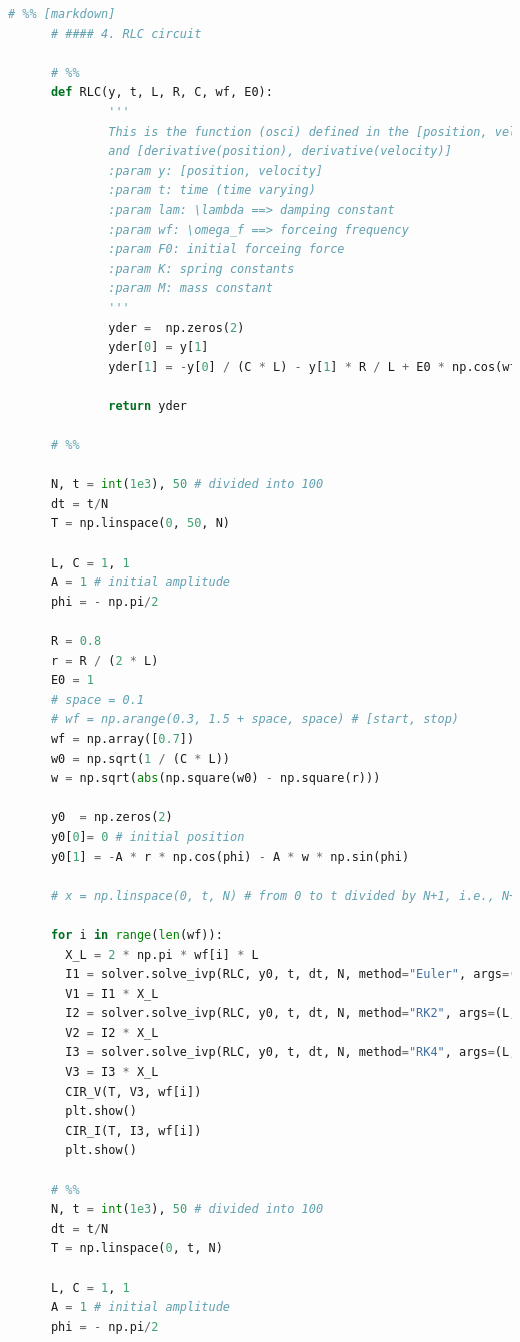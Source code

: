 \documentclass[12pt]{article}
\begin{document}
\begin{lstlisting}[language={Python}]
      # %% [markdown]
      # #### 4. RLC circuit

      # %%
      def RLC(y, t, L, R, C, wf, E0):
              '''
              This is the function (osci) defined in the [position, velocity] 
              and [derivative(position), derivative(velocity)]
              :param y: [position, velocity]
              :param t: time (time varying)
              :param lam: \lambda ==> damping constant
              :param wf: \omega_f ==> forceing frequency
              :param F0: initial forceing force
              :param K: spring constants
              :param M: mass constant
              '''
              yder =  np.zeros(2)
              yder[0] = y[1]
              yder[1] = -y[0] / (C * L) - y[1] * R / L + E0 * np.cos(wf * t) / L # the difinition of the acceleration, which is depend on the position.

              return yder

      # %%

      N, t = int(1e3), 50 # divided into 100
      dt = t/N
      T = np.linspace(0, 50, N)

      L, C = 1, 1
      A = 1 # initial amplitude
      phi = - np.pi/2

      R = 0.8
      r = R / (2 * L)
      E0 = 1
      # space = 0.1
      # wf = np.arange(0.3, 1.5 + space, space) # [start, stop)
      wf = np.array([0.7])
      w0 = np.sqrt(1 / (C * L))
      w = np.sqrt(abs(np.square(w0) - np.square(r)))

      y0  = np.zeros(2)
      y0[0]= 0 # initial position
      y0[1] = -A * r * np.cos(phi) - A * w * np.sin(phi)

      # x = np.linspace(0, t, N) # from 0 to t divided by N+1, i.e., N+1 equal parts.

      for i in range(len(wf)):
        X_L = 2 * np.pi * wf[i] * L
        I1 = solver.solve_ivp(RLC, y0, t, dt, N, method="Euler", args=(L, R, C, wf[i], E0))[1]
        V1 = I1 * X_L
        I2 = solver.solve_ivp(RLC, y0, t, dt, N, method="RK2", args=(L, R, C, wf[i], E0))[1]
        V2 = I2 * X_L
        I3 = solver.solve_ivp(RLC, y0, t, dt, N, method="RK4", args=(L, R, C, wf[i], E0))[1]
        V3 = I3 * X_L
        CIR_V(T, V3, wf[i])
        plt.show()
        CIR_I(T, I3, wf[i])
        plt.show()

      # %%
      N, t = int(1e3), 50 # divided into 100
      dt = t/N
      T = np.linspace(0, t, N)

      L, C = 1, 1
      A = 1 # initial amplitude
      phi = - np.pi/2


\end{lstlisting}
\end{document}
